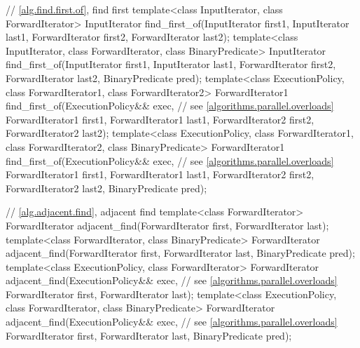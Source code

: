 \begin{codeblock}
{  // \ref{alg.find.first.of}, find first
  template<class InputIterator, class ForwardIterator>
    InputIterator
      find_first_of(InputIterator first1, InputIterator last1,
                    ForwardIterator first2, ForwardIterator last2);
  template<class InputIterator, class ForwardIterator, class BinaryPredicate>
    InputIterator
      find_first_of(InputIterator first1, InputIterator last1,
                    ForwardIterator first2, ForwardIterator last2,
                    BinaryPredicate pred);
  template<class ExecutionPolicy, class ForwardIterator1, class ForwardIterator2>
    ForwardIterator1
      find_first_of(ExecutionPolicy&& exec, // see \ref{algorithms.parallel.overloads}
                    ForwardIterator1 first1, ForwardIterator1 last1,
                    ForwardIterator2 first2, ForwardIterator2 last2);
  template<class ExecutionPolicy, class ForwardIterator1,
           class ForwardIterator2, class BinaryPredicate>
    ForwardIterator1
      find_first_of(ExecutionPolicy&& exec, // see \ref{algorithms.parallel.overloads}
                    ForwardIterator1 first1, ForwardIterator1 last1,
                    ForwardIterator2 first2, ForwardIterator2 last2,
                    BinaryPredicate pred);

  // \ref{alg.adjacent.find}, adjacent find
  template<class ForwardIterator>
    ForwardIterator adjacent_find(ForwardIterator first,
                                  ForwardIterator last);
  template<class ForwardIterator, class BinaryPredicate>
    ForwardIterator adjacent_find(ForwardIterator first,
                                  ForwardIterator last,
                                  BinaryPredicate pred);
  template<class ExecutionPolicy, class ForwardIterator>
    ForwardIterator adjacent_find(ExecutionPolicy&& exec, // see \ref{algorithms.parallel.overloads}
                                  ForwardIterator first,
                                  ForwardIterator last);
  template<class ExecutionPolicy, class ForwardIterator, class BinaryPredicate>
    ForwardIterator adjacent_find(ExecutionPolicy&& exec, // see \ref{algorithms.parallel.overloads}
                                  ForwardIterator first,
                                  ForwardIterator last,
                                  BinaryPredicate pred);

}
\end{codeblock}
